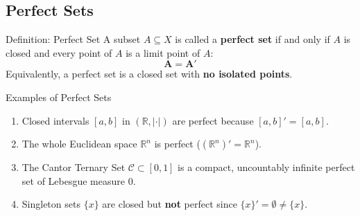 \documentclass[11pt,a4paper]{article}
\begin{document}
\subsection{Perfect Sets}

\begin{defbox}{Definition: Perfect Set}
A subset $A \subseteq X$ is called a \textbf{perfect set} if and only if $A$ is closed and every point of $A$ is a limit point of $A$:
\begin{equation}
    \mathbf{A = A'}
\end{equation}
Equivalently, a perfect set is a closed set with \textbf{no isolated points}.
\end{defbox}

\begin{exbox}{Examples of Perfect Sets}
\begin{enumerate}
    \item Closed intervals $[a, b]$ in $(\mathbb{R}, |\cdot|)$ are perfect because $[a, b]' = [a, b]$.
    \item The whole Euclidean space $\mathbb{R}^n$ is perfect ($(\mathbb{R}^n)' = \mathbb{R}^n$).
    \item The Cantor Ternary Set $\mathcal{C} \subset [0, 1]$ is a compact, uncountably infinite perfect set of Lebesgue measure $0$.
    \item Singleton sets $\{x\}$ are closed but \textbf{not} perfect since $\{x\}' = \emptyset \neq \{x\}$.
\end{enumerate}
\end{exbox}

\begin{center}
\end{center}
\end{document}
